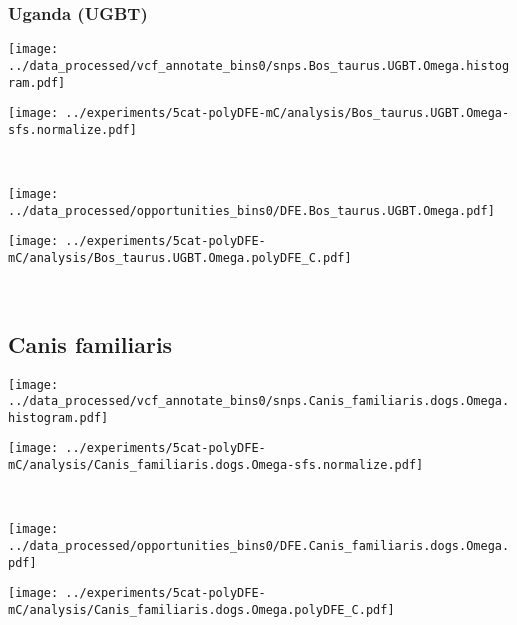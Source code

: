\subsubsection{Uganda (UGBT)}

\begin{minipage}{0.49\linewidth}
    \texttt{[image: ../data\_processed/vcf\_annotate\_bins0/snps.Bos\_taurus.UGBT.Omega.histogram.pdf]}
\end{minipage}
\begin{minipage}{0.49\linewidth}
    \texttt{[image: ../experiments/5cat-polyDFE-mC/analysis/Bos\_taurus.UGBT.Omega-sfs.normalize.pdf]}
\end{minipage}
\\
\begin{minipage}{0.49\linewidth}
    \texttt{[image: ../data\_processed/opportunities\_bins0/DFE.Bos\_taurus.UGBT.Omega.pdf]}
\end{minipage}
\begin{minipage}{0.49\linewidth}
    \texttt{[image: ../experiments/5cat-polyDFE-mC/analysis/Bos\_taurus.UGBT.Omega.polyDFE\_C.pdf]}
\end{minipage}
\\

\subsection{Canis familiaris}

\begin{minipage}{0.49\linewidth}
    \texttt{[image: ../data\_processed/vcf\_annotate\_bins0/snps.Canis\_familiaris.dogs.Omega.histogram.pdf]}
\end{minipage}
\begin{minipage}{0.49\linewidth}
    \texttt{[image: ../experiments/5cat-polyDFE-mC/analysis/Canis\_familiaris.dogs.Omega-sfs.normalize.pdf]}
\end{minipage}
\\
\begin{minipage}{0.49\linewidth}
    \texttt{[image: ../data\_processed/opportunities\_bins0/DFE.Canis\_familiaris.dogs.Omega.pdf]}
\end{minipage}
\begin{minipage}{0.49\linewidth}
    \texttt{[image: ../experiments/5cat-polyDFE-mC/analysis/Canis\_familiaris.dogs.Omega.polyDFE\_C.pdf]}
\end{minipage}
\\

